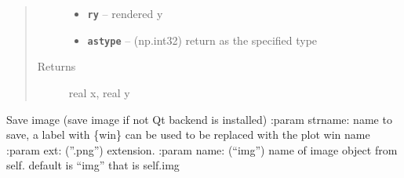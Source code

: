 \documentclass[letterpaper,10pt,english]{sphinxmanual}
\begin{document}
\begin{fulllineitems}
\begin{fulllineitems}
\begin{quote}
\begin{description}
\begin{itemize}
\item {} 
\textbf{\texttt{ry}} -- rendered y

\item {} 
\textbf{\texttt{astype}} -- (np.int32) return as the specified type

\end{itemize}

\item[{Returns}] \leavevmode
real x, real y

\end{description}\end{quote}

\end{fulllineitems}


\begin{fulllineitems}
\label{RRtoolbox.lib:RRtoolbox.lib.plotter.Plotim.rx1}
\end{fulllineitems}


\begin{fulllineitems}
\label{RRtoolbox.lib:RRtoolbox.lib.plotter.Plotim.rx2}
\end{fulllineitems}


\begin{fulllineitems}
\label{RRtoolbox.lib:RRtoolbox.lib.plotter.Plotim.ry1}
\end{fulllineitems}


\begin{fulllineitems}
\label{RRtoolbox.lib:RRtoolbox.lib.plotter.Plotim.ry2}
\end{fulllineitems}


\begin{fulllineitems}
\label{RRtoolbox.lib:RRtoolbox.lib.plotter.Plotim.save}
Save image (save image if not Qt backend is installed)
:param strname: name to save, a label with \{win\} can be used to be replaced with the plot win name
:param ext: (''.png'') extension.
:param name: (``img'') name of image object from self. default is ``img'' that is self.img
\begin{quote}


\end{quote}
\end{fulllineitems}
\end{fulllineitems}
\end{document}
